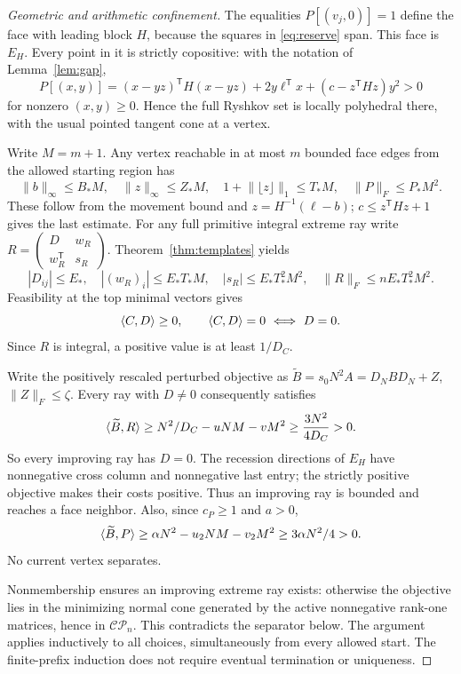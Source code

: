 \documentclass[11pt]{article}
\theoremstyle{definition}\newtheorem{definition}[theorem]{Definition}
\theoremstyle{remark}\newtheorem{remark}[theorem]{Remark}
\newcommand{\CP}{\mathcal{CP}}\newcommand{\COP}{\mathcal{COP}}\newcommand{\Ry}{\mathcal R}
\newcommand{\T}{^{\mathsf T}}\newcommand{\norm}[1]{\lVert #1\rVert}
\begin{document}
\begin{proof}[Geometric and arithmetic confinement]
The equalities $P[(v_j,0)]=1$ define the face with leading block $H$, because the squares in \eqref{eq:reserve} span. This face is $E_H$. Every point in it is strictly copositive: with the notation of Lemma~\ref{lem:gap},
\[
 P[(x,y)]=(x-yz)\T H(x-yz)+2y\ell\T x+(c-z\T Hz)y^2>0
\]
for nonzero $(x,y)\ge0$. Hence the full Ryshkov set is locally polyhedral there, with the usual pointed tangent cone at a vertex.

Write $M=m+1$. Any vertex reachable in at most $m$ bounded face edges from the allowed starting region has
\[
 \norm b_\infty\le B_*M,\quad \norm z_\infty\le Z_*M,\quad
 1+\norm{\lfloor z\rfloor}_1\le T_*M,\quad \norm P_F\le P_*M^2.
\]
These follow from the movement bound and $z=H^{-1}(\ell-b)$; $c\le z\T Hz+1$ gives the last estimate. For any full primitive integral extreme ray write $R=\left(\begin{smallmatrix}D&w_R\\w_R\T&s_R\end{smallmatrix}\right)$. Theorem~\ref{thm:templates} yields
\[
 |D_{ij}|\le E_*,\quad |(w_R)_i|\le E_*T_*M,\quad
 |s_R|\le E_*T_*^2M^2,\quad \norm R_F\le nE_*T_*^2M^2.
\]
Feasibility at the top minimal vectors gives
\[
 \ip C D\ge0,\qquad \ip C D=0\ \Longleftrightarrow\ D=0.
\]
Since $R$ is integral, a positive value is at least $1/D_C$.

Write the positively rescaled perturbed objective as
$\widetilde B=s_0N^2A=D_NBD_N+Z$, $\norm Z_F\le\zeta$.
Every ray with $D\ne0$ consequently satisfies
\[
 \langle \widetilde B,R\rangle\ge N^2/D_C-uNM-vM^2
 \ge\frac{3N^2}{4D_C}>0.
\]
So every improving ray has $D=0$. The recession directions of $E_H$ have nonnegative cross column and nonnegative last entry; the strictly positive objective makes their costs positive. Thus an improving ray is bounded and reaches a face neighbor. Also, since $c_P\ge1$ and $a>0$,
\[
 \langle \widetilde B,P\rangle\ge\alpha N^2-u_2NM-v_2M^2
 \ge3\alpha N^2/4>0.
\]
No current vertex separates.

Nonmembership ensures an improving extreme ray exists: otherwise the objective lies in the minimizing normal cone generated by the active nonnegative rank-one matrices, hence in $\CP_n$. This contradicts the separator below. The argument applies inductively to all choices, simultaneously from every allowed start. The finite-prefix induction does not require eventual termination or uniqueness.
\end{proof}
\end{document}
